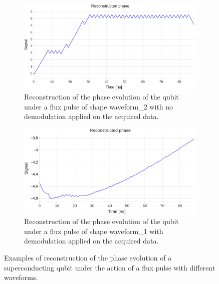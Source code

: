\begin{figure}[h!]
    \vspace{0.5cm}

    \begin{subfigure}[t]{0.495\textwidth}
        \includegraphics[width=\textwidth]{figures/png/Cryoscope/no_demod/long/phase.png}
        \caption{Reconstruction of the phase evolution of the qubit under a flux pulse of shape waveform\_2 with no demodulation applied on the acquired data.}
        \label{fig:no_demodulation:long}
    \end{subfigure}
    \hfill
    \begin{subfigure}[t]{0.495\textwidth}
        \includegraphics[width=\textwidth]{figures/png/Cryoscope/demodulation/long/phase.png}
        \caption{Reconstruction of the phase evolution of the qubit under a flux pulse of shape waveform\_1 with demodulation applied on the acquired data.}
        \label{fig:demodulation:long}
    \end{subfigure}

    \caption{Examples of reconstruction of the phase evolution of a superconducting qubit under the action of a flux pulse with different waveforms.}
    \label{fig:demodulation}
\end{figure}

